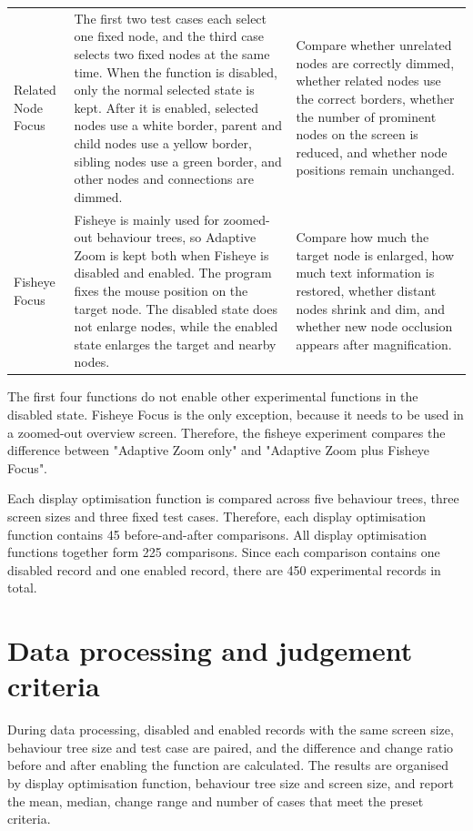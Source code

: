 \begin{center}
\begin{longtable}{@{}p{} p{} p{}@{}}
Related Node Focus & The first two test cases each select one fixed node, and the third case selects two fixed nodes at the same time. When the function is disabled, only the normal selected state is kept. After it is enabled, selected nodes use a white border, parent and child nodes use a yellow border, sibling nodes use a green border, and other nodes and connections are dimmed. & Compare whether unrelated nodes are correctly dimmed, whether related nodes use the correct borders, whether the number of prominent nodes on the screen is reduced, and whether node positions remain unchanged. \\
Fisheye Focus & Fisheye is mainly used for zoomed-out behaviour trees, so Adaptive Zoom is kept both when Fisheye is disabled and enabled. The program fixes the mouse position on the target node. The disabled state does not enlarge nodes, while the enabled state enlarges the target and nearby nodes. & Compare how much the target node is enlarged, how much text information is restored, whether distant nodes shrink and dim, and whether new node occlusion appears after magnification. \\
\bottomrule
\end{longtable}
\end{center}

The first four functions do not enable other experimental functions in the disabled state. Fisheye Focus is the only exception, because it needs to be used in a zoomed-out overview screen. Therefore, the fisheye experiment compares the difference between "Adaptive Zoom only" and "Adaptive Zoom plus Fisheye Focus".

Each display optimisation function is compared across five behaviour trees, three screen sizes and three fixed test cases. Therefore, each display optimisation function contains 45 before-and-after comparisons. All display optimisation functions together form 225 comparisons. Since each comparison contains one disabled record and one enabled record, there are 450 experimental records in total.

\section{Data processing and judgement criteria}

During data processing, disabled and enabled records with the same screen size, behaviour tree size and test case are paired, and the difference and change ratio before and after enabling the function are calculated. The results are organised by display optimisation function, behaviour tree size and screen size, and report the mean, median, change range and number of cases that meet the preset criteria.

